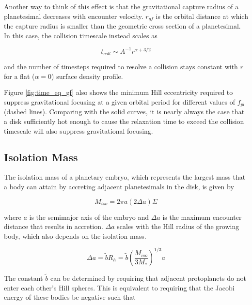 \documentclass[onecolumn]{aastex63}
\begin{document}
Another way to think of this effect is that the gravitational capture radius of a planetesimal decreases with encounter velocity. $r_{gf}$ is the orbital distance at which the capture radius is smaller than the geometric cross section of a planetesimal.  In this case, the collision timescale instead scales as 

\begin{equation}
    t_{coll} \sim A^{-1} r^{\alpha + 3/2}
\end{equation}

\noindent and the number of timesteps required to resolve a collision stays constant with $r$ for a flat ($\alpha = 0$) surface density profile.

Figure \ref{fig:time_eq_gf} also shows the minimum Hill eccentricity required to suppress gravitational focusing at a given orbital period for different values of $f_{pl}$ (dashed lines). Comparing with the solid curves, it is nearly always the case that a disk sufficiently hot enough to cause the relaxation time to exceed the collision timescale will also suppress gravitational focusing.

\subsection{Isolation Mass}

The isolation mass of a planetary embryo, which represents the largest mass that a body can attain by accreting adjacent planetesimals in the disk, is given by

\begin{equation}
    M_{iso} = 2 \pi a \left( 2 \Delta a \right) \Sigma
\end{equation}

\noindent where $a$ is the semimajor axis of the embryo and $\Delta a$ is the maximum encounter distance that results in accretion. $\Delta a$ scales with the Hill radius of the growing body, which also depends on the isolation mass.

\begin{equation}
    \Delta a = \tilde{b} R_{h} = \tilde{b} \left( \frac{M_{iso}}{3 M_{*}} \right)^{1/3} a
\end{equation}

The constant $\tilde{b}$ can be determined by requiring that adjacent protoplanets do not enter each other's Hill spheres. This is equivalent to requiring that the Jacobi energy of these bodies be negative such that \citep{Hayashi1977}
\end{document}
